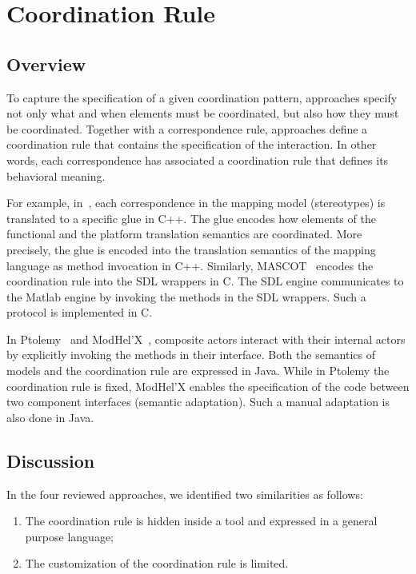 \section{Coordination Rule}
\subsection{Overview}
To capture the specification of a given coordination pattern, approaches specify not only what and when elements must be coordinated, but also how they must be coordinated. Together with a correspondence rule, approaches define a coordination rule that contains the specification of the interaction. In other words, each correspondence has associated a coordination rule that defines its behavioral meaning. 

For example, in~\cite{dinatale}, each correspondence in the mapping model (\ie stereotypes) is translated to a specific glue in C++. The glue encodes how elements of the functional and the platform translation semantics are coordinated. More precisely, the glue is encoded into the translation semantics of the mapping language as method invocation in C++. Similarly, MASCOT~\cite{mascotbib} encodes the coordination rule into the SDL wrappers in C. The SDL engine communicates to the Matlab engine by invoking the methods in the SDL wrappers. Such a protocol is implemented in C. 
			
In Ptolemy~\cite{ptoleframebib} and ModHel'X~\cite{modhelxbib}, composite actors interact with their internal actors by explicitly invoking the methods in their interface. Both the semantics of models and the coordination rule are expressed in Java. While in Ptolemy the coordination rule is fixed, ModHel'X enables the specification of the code between two component interfaces (\ie semantic adaptation). Such a manual adaptation is also done in Java.

\subsection{Discussion}
In the four reviewed approaches, we identified two similarities as follows:
	
\begin{enumerate}
\item The coordination rule is hidden inside a tool and expressed in a general purpose language;
\item The customization of the coordination rule is limited.
\end{enumerate}
		
